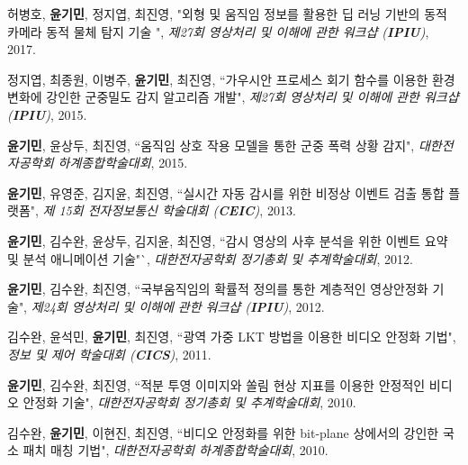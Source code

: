 \documentclass[10pt]{article}
\makeatletter
\newlength{\bibhang}
\newlength{\bibsep}
 {\@listi \global\bibsep\itemsep \global\advance\bibsep by\parsep}
\newenvironment{bibsection}%
        {\vspace{-\baselineskip}\begin{list}{}{%
       \setlength{\leftmargin}{\bibhang}%
       \setlength{\itemindent}{-\leftmargin}%
       \setlength{\itemsep}{\bibsep}%
       \setlength{\parsep}{\z@}%
        \setlength{\partopsep}{0pt}%
        \setlength{\topsep}{0pt}}}
        {\end{list}\vspace{-.6\baselineskip}}
\makeatother
\begin{document}
\begin{bibsection}
		\item 허병호, \textbf{윤기민}, 정지엽, 최진영, "외형 및 움직임 정보를 활용한 딥 러닝 기반의 동적 카메라 동적 물체 탐지 기술 ", \emph{제27회 영상처리 및 이해에 관한 워크샵 (\textbf{IPIU})}, 2017.
  
		\item 정지엽, 최종원, 이병주, \textbf{윤기민}, 최진영,
				``가우시안 프로세스 회기 함수를 이용한 환경변화에 강인한 군중밀도 감지 알고리즘 개발",
				 \emph{제27회 영상처리 및 이해에 관한 워크샵 (\textbf{IPIU})}, 2015.
		\item \textbf{윤기민}, 윤상두, 최진영,
				``움직임 상호 작용 모델을 통한 군중 폭력 상황 감지",
				 \emph{대한전자공학회 하계종합학술대회}, 2015.
		\item \textbf{윤기민}, 유영준, 김지윤, 최진영,
				``실시간 자동 감시를 위한 비정상 이벤트 검출 통합 플랫폼",
				 \emph{제 15회 전자정보통신 학술대회 (\textbf{CEIC})}, 2013.
		\item \textbf{윤기민}, 김수완, 윤상두, 김지윤, 최진영,
				``감시 영상의 사후 분석을 위한 이벤트 요약 및 분석 애니메이션 기술"`,
				 \emph{대한전자공학회 정기총회 및 추계학술대회}, 2012.
		\item \textbf{윤기민}, 김수완, 최진영,
				``국부움직임의 확률적 정의를 통한 계층적인 영상안정화 기술",
				\emph{제24회 영상처리 및 이해에 관한 워크샵 (\textbf{IPIU})}, 2012.
		\item  김수완, 윤석민, \textbf{윤기민}, 최진영,
				``광역 가중 LKT 방법을 이용한 비디오 안정화 기법",
				\emph{정보 및 제어 학술대회 (\textbf{CICS})}, 2011. 
		\item \textbf{윤기민}, 김수완, 최진영,
				``적분 투영 이미지와 쏠림 현상 지표를 이용한 안정적인 비디오 안정화 기술",
				\emph{대한전자공학회 정기총회 및 추계학술대회}, 2010.
        \item 김수완, \textbf{윤기민}, 이현진, 최진영,
              ``비디오 안정화를 위한 bit-plane 상에서의 강인한 국소 패치 매칭 기법",
              \emph{대한전자공학회 하계종합학술대회}, 2010. 
		


\end{bibsection}






\end{document}
